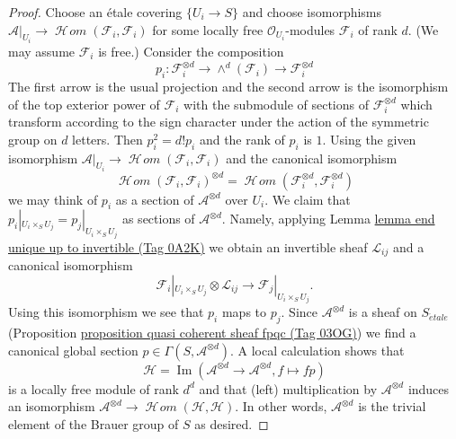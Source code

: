 \documentclass{amsart}
\theoremstyle{plain}
\theoremstyle{definition}
\theoremstyle{remark}
\numberwithin{equation}{subsection}
\def\SheafHom{\mathop{\mathcal{H}\!\mathit{om}}\nolimits}
\def\etale{{\acute{e}tale}}
\def\Im{\mathop{\mathrm{Im}}}
\begin{document}
\begin{proof}
Choose an \'etale covering $\{U_i \to S\}$ and choose isomorphisms
$\mathcal{A}|_{U_i} \to \SheafHom(\mathcal{F}_i, \mathcal{F}_i)$
for some locally free $\mathcal{O}_{U_i}$-modules $\mathcal{F}_i$
of rank $d$. (We may assume $\mathcal{F}_i$ is free.) Consider the
composition
$$
p_i : \mathcal{F}_i^{\otimes d} \to
\wedge^d(\mathcal{F}_i) \to \mathcal{F}_i^{\otimes d}
$$
The first arrow is the usual projection and the second arrow is
the isomorphism of the top exterior power of $\mathcal{F}_i$ with
the submodule of sections of $\mathcal{F}_i^{\otimes d}$ which transform
according to the sign character under the action of the symmetric group
on $d$ letters. Then $p_i^2 = d! p_i$ and the rank of $p_i$ is $1$.
Using the given isomorphism
$\mathcal{A}|_{U_i} \to \SheafHom(\mathcal{F}_i, \mathcal{F}_i)$
and the canonical isomorphism
$$
\SheafHom(\mathcal{F}_i, \mathcal{F}_i)^{\otimes d} =
\SheafHom(\mathcal{F}_i^{\otimes d}, \mathcal{F}_i^{\otimes d})
$$
we may think of $p_i$ as a section of $\mathcal{A}^{\otimes d}$
over $U_i$. We claim that $p_i|_{U_i \times_S U_j} = p_j|_{U_i \times_S U_j}$
as sections of $\mathcal{A}^{\otimes d}$. Namely, applying
Lemma \href{https://stacks.math.columbia.edu/tag/0A2K}{lemma end unique up to invertible (Tag 0A2K)}
we obtain an invertible sheaf $\mathcal{L}_{ij}$ and a canonical isomorphism
$$
\mathcal{F}_i|_{U_i \times_S U_j} \otimes \mathcal{L}_{ij}
\longrightarrow
\mathcal{F}_j|_{U_i \times_S U_j}.
$$
Using this isomorphism we see that $p_i$ maps to $p_j$.
Since $\mathcal{A}^{\otimes d}$ is a sheaf on $S_\etale$
(Proposition \href{https://stacks.math.columbia.edu/tag/03OG}{proposition quasi coherent sheaf fpqc (Tag 03OG)}) we find a canonical
global section $p \in \Gamma(S, \mathcal{A}^{\otimes d})$. A local calculation
shows that
$$
\mathcal{H} =
\Im(\mathcal{A}^{\otimes d} \to \mathcal{A}^{\otimes d}, f \mapsto fp)
$$
is a locally free module of rank $d^d$ and that (left) multiplication
by $\mathcal{A}^{\otimes d}$ induces an isomorphism
$\mathcal{A}^{\otimes d} \to \SheafHom(\mathcal{H}, \mathcal{H})$.
In other words, $\mathcal{A}^{\otimes d}$ is the trivial element
of the Brauer group of $S$ as desired.
\end{proof}
\end{document}
